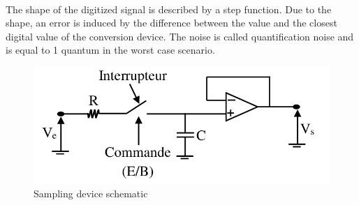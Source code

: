 \documentclass{article}[12pt]
\begin{document}
\paragraph{}
The shape of the digitized signal is described by a step function. Due to the shape, an error is induced by the difference between the value and the closest digital value of the conversion device. The noise is called quantification noise and is equal to 1 quantum in the worst case scenario.
\begin{figure}[H]
    \centering
    \includegraphics[width=.6\textwidth]{figures/echantilloneur.png}
    \caption{Sampling device schematic \cite{book}}
    \label{fig:CAN_ech}
\end{figure}
\end{document}

